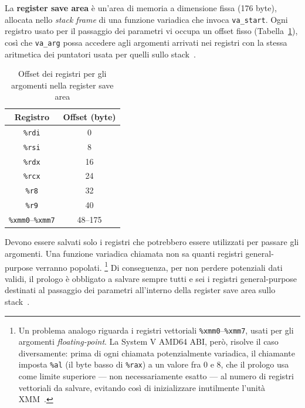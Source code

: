 \begin{defn}\label{def:reg_save_area}
    La \textbf{register save area} è un'area di memoria a dimensione fissa (176 byte), allocata nello \emph{stack frame} di una funzione variadica che invoca \texttt{va\_start}.
    Ogni registro usato per il passaggio dei parametri vi occupa un offset fisso (Tabella~\ref{tab:register_save_area}), così che \texttt{va\_arg} possa accedere agli argomenti arrivati nei registri con la stessa aritmetica dei puntatori usata per quelli sullo stack~\cite{psabi2025}.
\end{defn}

\begin{table}[ht]
    \centering
    \caption{Offset dei registri per gli argomenti nella register save area}
    \label{tab:register_save_area}
    \begin{tabular}{cc}
        \toprule
        Registro & Offset (byte) \\
        \midrule
        \texttt{\%rdi} & 0 \\
        \texttt{\%rsi} & 8 \\
        \texttt{\%rdx} & 16 \\
        \texttt{\%rcx} & 24 \\
        \texttt{\%r8}  & 32 \\
        \texttt{\%r9}  & 40 \\
        \midrule
        \texttt{\%xmm0}--\texttt{\%xmm7} & 48--175 \\
        \bottomrule
    \end{tabular}
\end{table}

Devono essere salvati solo i registri che potrebbero essere utilizzati per passare gli argomenti. 
Una funzione variadica chiamata non sa quanti registri general-purpose verranno popolati.
\footnote{Un problema analogo riguarda i registri vettoriali \texttt{\%xmm0}--\texttt{\%xmm7}, usati per gli argomenti \emph{floating-point}. La System V AMD64 ABI, però, risolve il caso diversamente: prima di ogni chiamata potenzialmente variadica, il chiamante imposta \texttt{\%al} (il byte basso di \texttt{\%rax}) a un valore fra 0 e 8, che il prologo usa come limite superiore --- non necessariamente esatto --- al numero di registri vettoriali da salvare, evitando così di inizializzare inutilmente l'unità XMM~\cite{psabi2025}.}
Di conseguenza, per non perdere potenziali dati validi, il prologo è obbligato a salvare sempre tutti e sei i registri general-purpose destinati al passaggio dei parametri all'interno della register save area sullo stack~\cite{psabi2025}.

